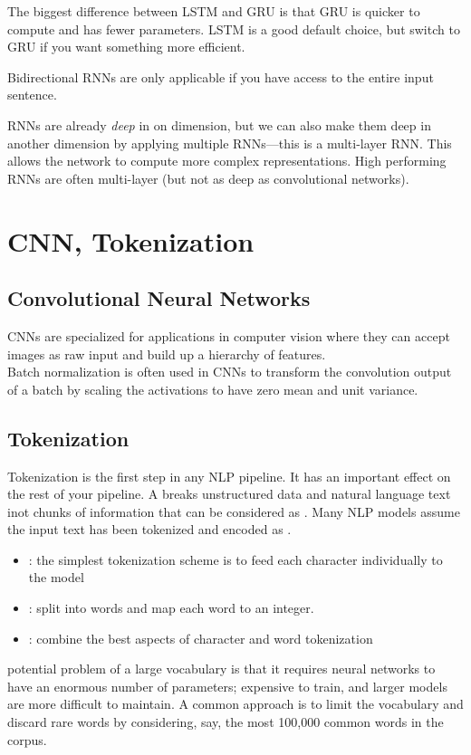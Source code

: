 \documentclass{article}
\begin{document}
The biggest difference between LSTM and GRU is that GRU is quicker to compute and has fewer parameters. LSTM is a good default choice, but switch to GRU if you want something more efficient. \\ 

\begin{remark}
  Bidirectional RNNs are only applicable if you have access to the entire input sentence. 
\end{remark}

RNNs are already \emph{deep} in on dimension, but we can also make them deep in another dimension by applying multiple RNNs---this is a multi-layer RNN. This allows the network to compute more complex representations. High performing RNNs are often multi-layer (but not as deep as convolutional networks). 

\section{CNN, Tokenization}

\subsection{Convolutional Neural Networks}

CNNs are specialized for applications in computer vision where they can accept images as raw input and build up a hierarchy of features. \\ 

Batch normalization is often used in CNNs to transform the convolution output of a batch by scaling the activations to have zero mean and unit variance. 

\subsection{Tokenization}

Tokenization is the first step in any NLP pipeline. It has an important effect on the rest of your pipeline. A  breaks unstructured data and natural language text inot chunks of information that can be considered as . Many NLP models assume the input text has been tokenized and encoded as . 
\begin{itemize}
  \item {}: the simplest tokenization scheme is to feed each character individually to the model 
  \item {}: split into words and map each word to an integer. 
  \item {}: combine the best aspects of character and word tokenization
\end{itemize}
 potential problem of a large vocabulary is that it requires neural networks to have an enormous number of parameters; expensive to train, and larger models are more difficult to maintain. A common approach is to limit the vocabulary and discard rare words by considering, say, the most 100,000 common words in the corpus. \\ 
\end{document}
